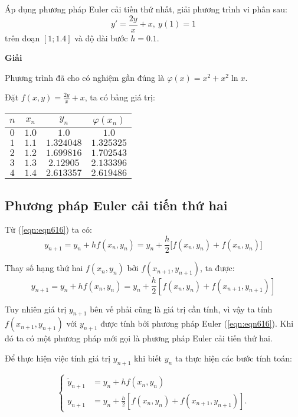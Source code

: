 \begin{example}
	Áp dụng phương pháp Euler cải tiến thứ nhất, giải phương trình vi phân sau:
	\begin{equation}
		y'=\frac{2y}{x}+x,~y(1)=1
	\end{equation}
	trên đoạn $\left[1;1.4\right]$ và độ dài bước $h=0.1$.\par
\end{example}

\textbf{Giải}\par
Phương trình đã cho có nghiệm gần đúng là $\varphi(x)=x^2+x^2\ln x$.\par
Đặt $f(x,y)=\frac{2y}{x}+x$, ta có bảng giá trị:
\begin{longtable}{|c|c|c|c|}\hline
	$n$ & $x_n$ & $y_n$      & $\varphi(x_n)$\\\hline
	\endhead
	$0$ & $1.0$ & $1.0$      & $1.0$      \\\hline
	$1$ & $1.1$ & $1.324048$ & $1.325325$ \\\hline
	$2$ & $1.2$ & $1.699816$ & $1.702543$ \\\hline
	$3$ & $1.3$ & $2.12905$  & $2.133396$ \\\hline
	$4$ & $1.4$ & $2.613357$ & $2.619486$ \\\hline
\end{longtable}

\subsection{Phương pháp Euler cải tiến thứ hai}

Từ (\ref{eqn:eqn616}) ta có:
$$y_{n+1}=y_n+hf(x_n,y_n)=y_n+\frac h2\big[f(x_n,y_n)+f(x_n,y_n )\big]$$

Thay số hạng thứ hai $f(x_n,y_n)$ bởi $f(x_{n+1},y_{n+1})$, ta được:
$$y_{n+1}=y_n+hf(x_n,y_n)=y_n+\frac h2\left[ f(x_n,y_n)+f(x_{n+1},y_{n+1}) \right]$$

Tuy nhiên giá trị $y_{n+1}$ bên vế phải cũng là giá trị cần tính, vì vậy ta tính $f(x_{n+1},y_{n+1})$ với $y_{n+1}$ được tính bởi phương pháp Euler (\ref{eqn:eqn616}). Khi đó ta có một phương pháp mới gọi là phương pháp Euler cải tiến thứ hai.\par
Để thực hiện việc tính giá trị $y_{n+1}$  khi biết $y_n$  ta thực hiện các bước tính toán:\par

\begin{equation}\label{eqn:eqn619}\begin{cases}
	\tilde{y}_{n+1}&=y_n+hf(x_n,y_n)\\
	 y_{n+1}&=y_n+\frac h2\left[ f(x_n,y_n)+f(x_{n+1},y_{n+1}) \right].
\end{cases}\end{equation}

